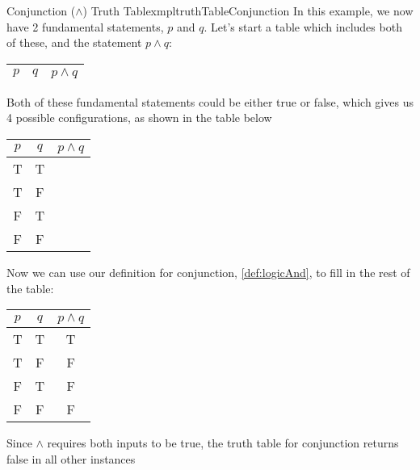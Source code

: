 \begin{exmpl}[label={exmpl:truthTableConjunction}]{Conjunction ($\land$) Truth Table}{xmpltruthTableConjunction}
    In this example, we now have 2 fundamental statements, $p$ and $q$. Let's start a table which includes both of these, and the statement $p \land q$:
    \begin{center}
        \begin{tabular}{|c|c|c|}
            \hline
            $p$ & $q$ & $p \land q$ \\
            \hline
        \end{tabular}
    \end{center}
    Both of these fundamental statements could be either true or false, which gives us 4 possible configurations, as shown in the table below
    \begin{center}
        \begin{tabular}{|c|c|c|}
            \hline
            $p$ & $q$ & $p \land q$ \\
            \hline
            T   & T   &             \\
            \hline
            T   & F   &             \\
            \hline
            F   & T   &             \\
            \hline
            F   & F   &             \\
            \hline
        \end{tabular}
    \end{center}

    Now we can use our definition for conjunction, \cref{def:logicAnd}, to fill in the rest of the table:
    \begin{center}
        \begin{tabular}{|c|c|c|}
            \hline
            $p$ & $q$ & $p \land q$ \\
            \hline
            T   & T   & T           \\
            \hline
            T   & F   & F           \\
            \hline
            F   & T   & F           \\
            \hline
            F   & F   & F           \\
            \hline
        \end{tabular}
    \end{center}

    Since $\land$ requires both inputs to be true, the truth table for conjunction returns false in all other instances
\end{exmpl}

